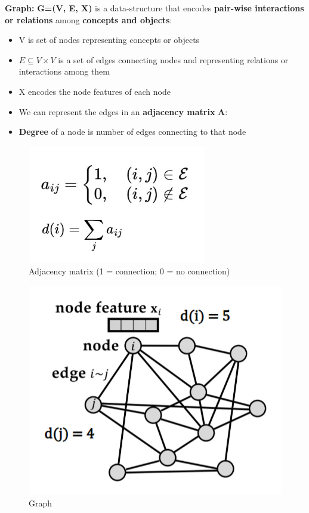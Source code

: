 \begin{definition}
    \textbf{Graph:}  \textbf{G=(V, E, X)} is a data-structure that encodes \textbf{pair-wise interactions or relations} among \textbf{concepts and objects}:
\begin{itemize}
    \item V is set of nodes representing concepts or objects
    \item $E \subseteq V \times V$ is a set of edges connecting nodes and representing relations or interactions among them
    \item X encodes the node features of each node
    \item We can represent the edges in an \textbf{adjacency matrix} \textbf{A}:
    \item \textbf{Degree} of a node is number of edges connecting to that node
\end{itemize}
\end{definition}

\begin{figure}[h!t]
    \centering
    \includegraphics[width=0.4\linewidth]{Adjencymat.png}
    \caption{Adjacency matrix (1 = connection; 0 = no connection)}
    \label{fig:enter-label}
\end{figure}

\begin{figure}[h!t]
    \centering
    \includegraphics[width=0.35\linewidth]{graph.png}
    \caption{Graph}
    \label{fig:enter-label}
\end{figure}

